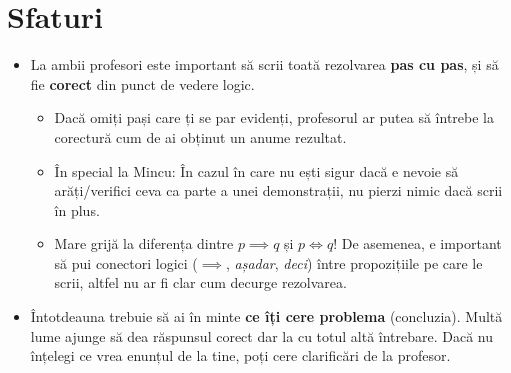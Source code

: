 \section*{Sfaturi}
\begin{itemize}
    \item La ambii profesori este important să scrii toată rezolvarea \textbf{pas cu pas}, și să fie \textbf{corect} din punct de vedere logic.
    \begin{itemize}
        \item Dacă omiți pași care ți se par evidenți, profesorul ar putea să întrebe la corectură cum de ai obținut un anume rezultat.
        \item În special la Mincu: În cazul în care nu ești sigur dacă e nevoie să arăți/verifici ceva ca parte a unei demonstrații, nu pierzi nimic dacă scrii în plus.
        \item Mare grijă la diferența dintre \(p \implies q\) și \(p \iff q\)! De asemenea, e important să pui conectori logici (\(\implies\), \emph{așadar}, \emph{deci}) între propozițiile pe care le scrii, altfel nu ar fi clar cum decurge rezolvarea.
    \end{itemize}
    \item Întotdeauna trebuie să ai în minte \textbf{ce îți cere problema} (concluzia). Multă lume ajunge să dea răspunsul corect dar la cu totul altă întrebare. Dacă nu înțelegi ce vrea enunțul de la tine, poți cere clarificări de la profesor.
\end{itemize}